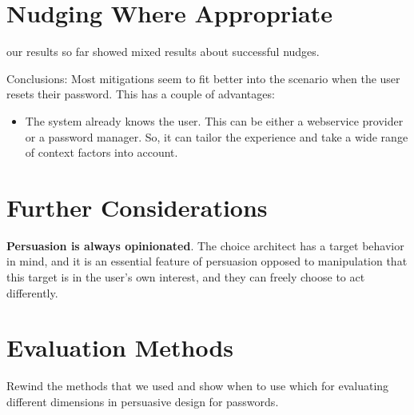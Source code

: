 \section{Nudging Where Appropriate}
our results so far showed mixed results about successful nudges. 


Conclusions: Most mitigations seem to fit better into the scenario when the user resets their password. This has a couple of advantages:
\begin{itemize}
	\item The system already knows the user. This can be either a webservice provider or a password manager. So, it can tailor the experience and take a wide range of context factors into account. 
\end{itemize}


\section{Further Considerations}

\textbf{Persuasion is always opinionated}. The choice architect has a target behavior in mind, and it is an essential feature of persuasion opposed to manipulation that this target is in the user's own interest, and they can freely choose to act differently. 


\section{Evaluation Methods}
Rewind the methods that we used and show when to use which for evaluating different dimensions in persuasive design for passwords. 


